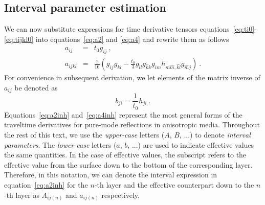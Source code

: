 \subsection{Interval parameter estimation}
We can now substitute expressions for time derivative tensors  equations~\ref{eq:ti0}-\ref{eq:tijkl0} into equations~\ref{eq:a2} and \ref{eq:a4} and rewrite them as follows
\begin{eqnarray}
\label{eq:a2inh}
a_{ij} & = & t_0 g_{ij}~,\\
\label{eq:a4inh}
a_{ijkl} & = & \frac{1}{16} \left( g_{ij} g_{kl} - \frac{t_0}{3}g_{\hat{l}l}g_{\hat{k}k}g_{im}h_{m \hat{m},\hat{k}\hat{l}}g_{\hat{m}j} \right)~.
\end{eqnarray}
For convenience in subsequent derivation, we let elements of the matrix inverse of $a_{ij}$ be denoted as
\begin{equation}
\label{eq:b2inh}
b_{ji} = \frac{1}{t_0} h_{ji}~.
\end{equation}
Equations~\ref{eq:a2inh} and~\ref{eq:a4inh} represent the most general forms of the traveltime derivatives for pure-mode reflections in  anisotropic  media.
Throughout the rest of this text,  we  use the \textit{upper-case} letters ($A$, $B$, ...) to denote \textit{interval parameters}. The \textit{lower-case} letters ($a$, $b$, ...) are used to indicate effective values  the same quantities. In the case of effective values, the subscript refers to the effective value from the surface down to the bottom of the corresponding layer. Therefore, in this notation, we can denote the interval expression in equation~\ref{eq:a2inh} for the $n$-th layer and the effective counterpart down to the $n$-th layer as $A_{ij(n)}$ and $a_{ij(n)}$ respectively.

